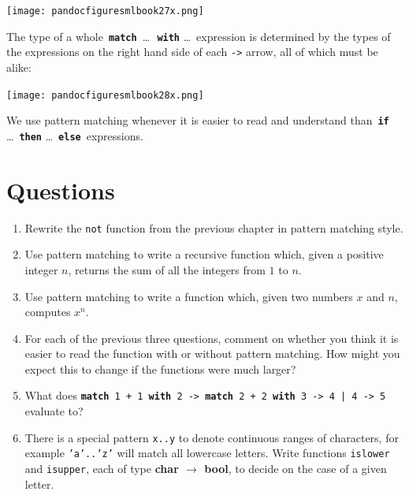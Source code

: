 \documentclass[]{book}
\begin{document}
\medskip
\begin{center}
\noindent\texttt{[image: pandocfiguresmlbook27x.png]}
\end{center}
\medskip

\noindent The type of a whole \,\textbf{\texttt{match}}\, \ldots\ \,\textbf{\texttt{with}} \ldots\ expression is determined by the types of the expressions on the right hand side of each \texttt{->} arrow, all of which must be alike:

\medskip
\begin{center}
\noindent\texttt{[image: pandocfiguresmlbook28x.png]}
\end{center}
\medskip

\noindent We use pattern matching whenever it is easier to read and understand than \,\textbf{\texttt{if}} \ldots\  \textbf{\texttt{then}} \ldots\ \textbf{\texttt{else}}\, expressions. 

\clearpage
\section*{Questions}

\begin{enumerate}
  \item Rewrite the \texttt{not} function from the previous chapter in pattern matching style.
  \item Use pattern matching to write a recursive function which, given a positive integer $n$, returns the sum of all the integers from $1$ to $n$.
  \item Use pattern matching to write a function which, given two numbers $x$ and $n$, computes $x^n$.
  \item For each of the previous three questions, comment on whether you think it is easier to read the function with or without pattern matching. How might you expect this to change if the functions were much larger?
  \item What does \textbf{\texttt{match}}\texttt{ 1 + 1 }\textbf{\texttt{with}}\texttt{ 2 -> }\textbf{\texttt{match}}\texttt{ 2 + 2 }\textbf{\texttt{with}}\texttt{ 3 -> 4 | 4 -> 5} evaluate to?
  \item There is a special pattern \texttt{x..y} to denote continuous ranges of characters, for example \texttt{'a'..'z'} will match all lowercase letters. Write functions \texttt{islower} and \texttt{isupper}, each of type \textsf{\textbf{char $\rightarrow$ bool}}, to decide on the case of a given letter. 
\end{enumerate}
\end{document}
